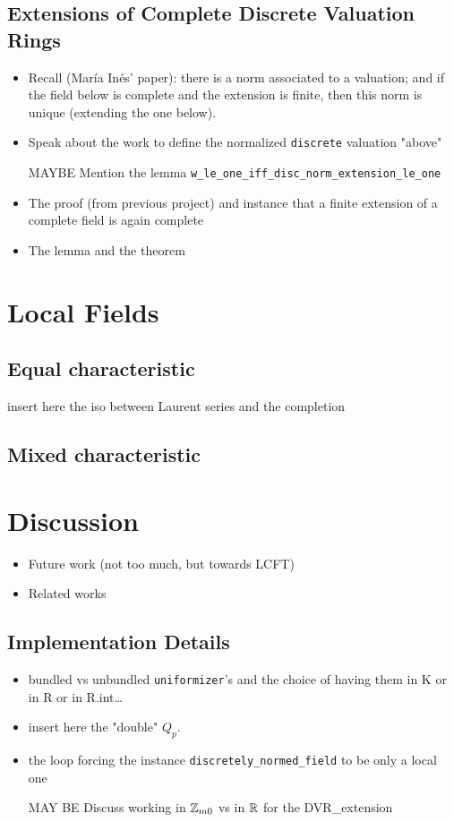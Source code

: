 \documentclass[sigplan,10pt,anonymous,review]{acmart}\settopmatter{printfolios=true,printccs=false,printacmref=false}
\begin{document}
\subsection{Extensions of Complete Discrete Valuation Rings}
\begin{itemize}
\item Recall (María Inés' paper): there is a norm associated to a valuation; and if the field below is complete and the extension is finite, then this norm is unique (extending the one below).
\item Speak about the work to define the normalized \texttt{discrete} valuation "above"
\item [MAYBE] Mention the lemma \texttt{w\_le\_one\_iff\_disc\_norm\_extension\_le\_one}
\item The proof (from previous project) and instance that a finite extension of a complete field is again complete
\item The lemma  and the theorem 
\end{itemize}
\section{Local Fields}
\subsection{Equal characteristic}
insert here the iso between Laurent series and the completion
\subsection{Mixed characteristic}
\section{Discussion}
\begin{itemize}
\item Future work (not too much, but towards LCFT)
\item Related works
\end{itemize}
\subsection{Implementation Details}
\begin{itemize}
\item bundled vs unbundled \texttt{uniformizer}'s and the choice of having them in K or in R or in R.int\dots
\item insert here the "double" $Q_p$.
\item the loop forcing the instance \texttt{discretely\_normed\_field} to be only a local one
\item [MAY BE] Discuss working in $\mathbb{Z}_{m0}$ vs in $\mathbb{R}$ for the DVR\_extension
\end{itemize}
\end{document}
